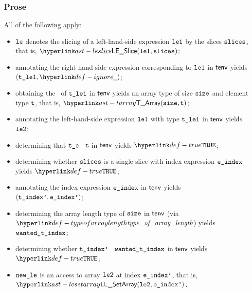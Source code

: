\subsubsection{Prose}
All of the following apply:
\begin{itemize}
  \item $\texttt{le}$ denotes the slicing of a left-hand-side expression $\texttt{le1}$ by the slices $\texttt{slices}$, that is, $\LESlice(\vleone, \slices)$;
  \item annotating the right-hand-side expression corresponding to $\texttt{le1}$ in $\textsf{tenv}$ yields \\ $(\vtleone, \Ignore)$\ProseOrTypeError;
  \item obtaining the \structure\ of $\texttt{t\_le1}$ in $\textsf{tenv}$ yields an array type of size $\texttt{size}$ and element type $\texttt{t}$, that is, $\TArray(\size, \vt)$\ProseOrTypeError;
  \item annotating the left-hand-side expression $\texttt{le1}$ with type $\texttt{t\_le1}$ in $\textsf{tenv}$ yields $\texttt{le2}$\ProseOrTypeError;
  \item determining that $\texttt{t\_e}$ \typesatisfies\ $\texttt{t}$ in $\textsf{tenv}$ yields $\True$\ProseOrTypeError;
  \item determining whether $\texttt{slices}$ is a single slice with index expression $\texttt{e\_index}$ yields $\True$\ProseOrTypeError;
  \item annotating the index expression $\texttt{e\_index}$ in $\textsf{tenv}$ yields $(\texttt{t\_index'}, \texttt{e\_index'})$\ProseOrTypeError;
  \item determining the array length type of $\texttt{size}$ in $\textsf{tenv}$ (via $\typeofarraylength$) yields $\texttt{wanted\_t\_index}$;
  \item determining whether $\texttt{t\_index'}$ \typesatisfies\ $\texttt{wanted\_t\_index}$ in $\textsf{tenv}$ yields \\
        $\True$\ProseOrTypeError;
  \item $\texttt{new\_le}$ is an access to array $\texttt{le2}$ at index $\texttt{e\_index'}$, that is, \\ $\LESetArray(\vletwo, \eindexp)$.
\end{itemize}
